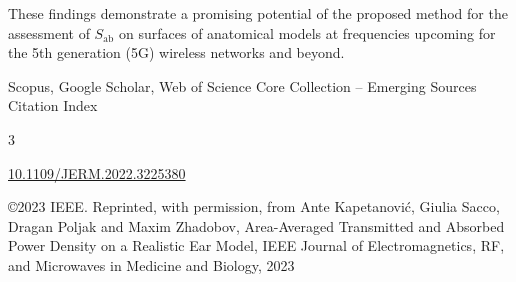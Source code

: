 \begin{description}[leftmargin=!,labelwidth=\widthof{\bfseries Volume and number}]
    These findings demonstrate a promising potential of the proposed method for the assessment of $S_\text{ab}$ on surfaces of anatomical models at frequencies upcoming for the 5th generation (5G) wireless networks and beyond.
    \item[Databases] Scopus, Google Scholar, Web of Science Core Collection -- Emerging Sources Citation Index
    \item[Impact factor] 3
    \item[DOI] \href{https://doi.org/10.1109/JERM.2022.3225380}{\url{10.1109/JERM.2022.3225380}}
    \item[Copyright notice] \copyright 2023 IEEE. Reprinted, with permission, from Ante Kapetanović, Giulia Sacco, Dragan Poljak and Maxim Zhadobov, Area-Averaged Transmitted and Absorbed Power Density on a Realistic Ear Model, IEEE Journal of Electromagnetics, RF, and Microwaves in Medicine and Biology, 2023
\end{description}

\cleardoublepage


